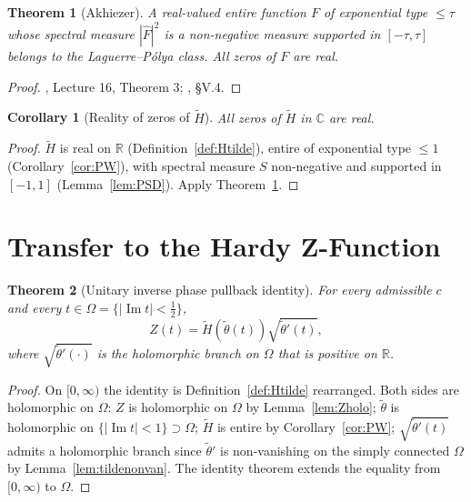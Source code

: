 \documentclass[11pt]{article}
\newtheorem{theorem}{Theorem}
\newtheorem{corollary}{Corollary}
\DeclareMathOperator{\ImOp}{Im}
\let\Im\ImOp
\begin{document}
\begin{theorem}[Akhiezer]\label{thm:akhiezer}
A real-valued entire function $F$ of exponential type $\le\tau$ whose spectral measure $|\hat F|^2$ is a non-negative measure supported in $[-\tau,\tau]$ belongs to the Laguerre--P\'olya class. All zeros of $F$ are real.
\end{theorem}

\begin{proof}\cite{Levin}, Lecture 16, Theorem 3; \cite{Akhiezer}, \S V.4.\end{proof}

\begin{corollary}[Reality of zeros of $\tilde H$]\label{cor:Hzero}
All zeros of $\tilde H$ in $\mathbb{C}$ are real.
\end{corollary}

\begin{proof}
$\tilde H$ is real on $\mathbb{R}$ (Definition~\ref{def:Htilde}), entire of exponential type $\le 1$ (Corollary~\ref{cor:PW}), with spectral measure $S$ non-negative and supported in $[-1,1]$ (Lemma~\ref{lem:PSD}). Apply Theorem~\ref{thm:akhiezer}.
\end{proof}

\section{Transfer to the Hardy Z-Function}

\begin{theorem}[Unitary inverse phase pullback identity]\label{thm:utc}
For every admissible $c$ and every $t\in\Omega=\{|\Im t|<\tfrac{1}{2}\}$,
\[
Z(t)=\tilde H(\tilde\theta(t))\sqrt{\tilde\theta'(t)},
\]
where $\sqrt{\tilde\theta'(\cdot)}$ is the holomorphic branch on $\Omega$ that is positive on $\mathbb{R}$.
\end{theorem}

\begin{proof}
On $[0,\infty)$ the identity is Definition~\ref{def:Htilde} rearranged. Both sides are holomorphic on $\Omega$: $Z$ is holomorphic on $\Omega$ by Lemma~\ref{lem:Zholo}; $\tilde\theta$ is holomorphic on $\{|\Im t|<1\}\supset\Omega$; $\tilde H$ is entire by Corollary~\ref{cor:PW}; $\sqrt{\tilde\theta'(t)}$ admits a holomorphic branch since $\tilde\theta'$ is non-vanishing on the simply connected $\Omega$ by Lemma~\ref{lem:tildenonvan}. The identity theorem extends the equality from $[0,\infty)$ to $\Omega$.
\end{proof}
\end{document}
